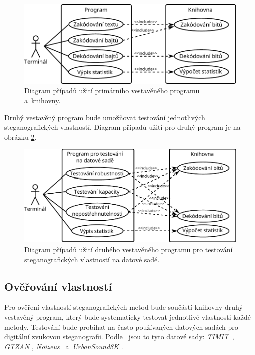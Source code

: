 \begin{figure}[hbt]
    \centering
    \includegraphics[width=\textwidth]{obrazky/use-case-diagram-1.pdf}
    \caption{Diagram případů užití primárního vestavěného programu a~knihovny.}
    \label{pic:use-case-diagram-main}
\end{figure}

Druhý vestavěný program bude umožňovat testování jednotlivých steganografických
vlastností. Diagram případů užití pro druhý program je na obrázku
\ref{pic:use-case-diagram-testing}.

\begin{figure}[hbt]
    \centering
    \includegraphics[width=\textwidth]{obrazky/use-case-diagram-2.pdf}
    \caption{Diagram případů užití druhého vestavěného programu pro testování
    steganografických vlastností na datové sadě.}
    \label{pic:use-case-diagram-testing}
\end{figure}

\subsection*{Ověřování vlastností}
\label{sub:method-property-verification}

Pro ověření vlastností steganografických metod bude součástí knihovny druhý
vestavěný program, který bude systematicky testovat jednotlivé vlastnosti každé
metody. Testování bude probíhat na často používaných datových sadách pro
digitální zvukovou steganografii. Podle~\cite{AlSabhany2020} jsou to tyto
datové sady: \textit{TIMIT}~\cite{Garofolo1993}, \textit{GTZAN}
\cite{Tzanetakis2001}, \textit{Noizeus}~\cite{Hu2006} a~\textit{UrbanSound8K}
\cite{Salamon2014}.


